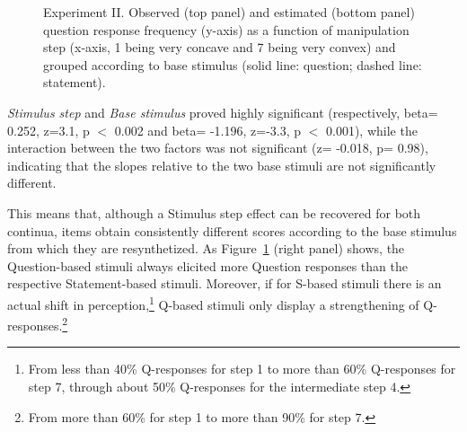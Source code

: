 \begin{figure}
\centering
{}
\caption{Experiment II. Observed (top panel) and estimated (bottom panel) question response frequency (y-axis) as a function of manipulation step (x-axis, 1 being very concave and 7 being very convex) and grouped according to base stimulus (solid line: question; dashed line: statement).}
\label{fig307}\end{figure}

\textit{Stimulus step} and \textit{Base stimulus} proved highly significant (respectively, beta= 0.252,  z=3.1, p $<$ 0.002 and beta= -1.196, z=-3.3, p $<$ 0.001), while the interaction between the two factors was not significant (z= -0.018, p= 0.98), indicating that the slopes relative to the two base stimuli are not significantly different. 

This means that, although a Stimulus step effect can be recovered for both continua, items obtain consistently different scores according to the base stimulus from which they are resynthetized. As Figure~\ref{fig307} (right panel) shows, the Question-based stimuli always elicited more Question responses than the respective Statement-based stimuli. Moreover, if for S-based stimuli there is an actual shift in perception,\footnote{From less than 40\% Q-responses for step 1 to more than 60\% Q-responses for step 7, through about 50\% Q-responses for the intermediate step 4.} Q-based stimuli only display a strengthening of Q-responses.\footnote{From more than 60\% for step 1 to more than 90\% for step 7.}

